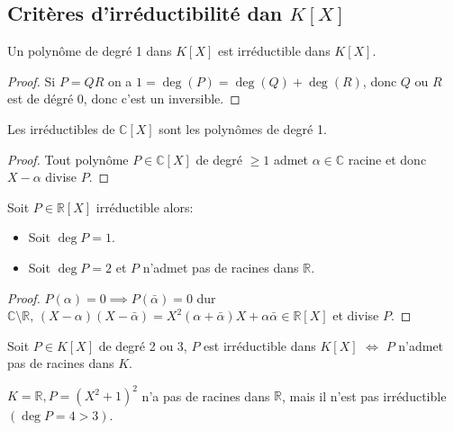 \subsection{Critères d'irréductibilité dan $K[X]$}

\begin{prop}
	Un polynôme de degré 1 dans $K[X]$ est irréductible dans $K[X]$.
\end{prop}

\begin{proof}
	Si $P = QR$ on a $ 1 = \deg(P) = \deg(Q) + \deg(R)$, donc $Q$ ou $R$ est de dégré 0, donc c'est un inversible.
\end{proof}

\begin{theorem}
	Les irréductibles de $\mathbb{C}[X]$ sont les polynômes de degré 1.
\end{theorem}

\begin{proof}
	Tout polynôme $P\in \mathbb{C}[X]$ de degré $\geq 1$ admet $\alpha \in \mathbb{C}$ racine et donc $X-\alpha$ divise $P$.
\end{proof}

\begin{prop}
	Soit $P \in \mathbb{R}[X]$ irréductible alors:
	\begin{itemize}
		\item Soit $\deg P = 1$.
		\item Soit $\deg P = 2$ et $P$ n'admet pas de racines dans $\mathbb{R}$.
	\end{itemize}
\end{prop}

\begin{proof}
	$P(\alpha) = 0 \implies P(\bar{\alpha}) = 0$
	dur $\mathbb{C} \setminus \mathbb{R}, \, (X- \alpha) (X- \bar{\alpha}) = X ^2(\alpha + \bar{\alpha})X +
		\alpha\bar{\alpha} \in \mathbb{R}[X]$
	et divise $P$.
\end{proof}

\begin{prop}
	Soit $P \in K[X]$ de degré 2 ou 3,
	$P$ est irréductible dans $K[X]$ $\iff$ $P$ n'admet pas de racines dans $K$.
\end{prop}

\begin{exemple}
	$K = \mathbb{R}, P = (X^2 + 1 )^2$ n'a pas de racines dans $\mathbb{R}$, mais il n'est pas irréductible $(\deg P = 4 > 3)$.
\end{exemple}

